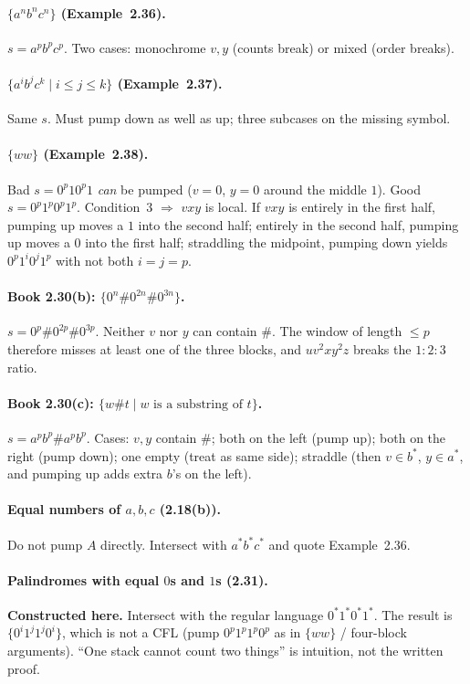\documentclass[11pt,a4paper]{article}
\begin{document}
\paragraph{$\{a^nb^nc^n\}$ (Example~2.36).}
$s=a^pb^pc^p$. Two cases: monochrome $v,y$ (counts break) or
mixed (order breaks).

\paragraph{$\{a^ib^jc^k\mid i\le j\le k\}$ (Example~2.37).}
Same $s$. Must pump down as well as up; three subcases on the
missing symbol.

\paragraph{$\{ww\}$ (Example~2.38).}
Bad $s=0^p10^p1$ \emph{can} be pumped ($v=0$, $y=0$ around the
middle $1$). Good $s=0^p1^p0^p1^p$. Condition~3 $\Rightarrow$
$vxy$ is local. If $vxy$ is entirely in the first half, pumping
up moves a $1$ into the second half; entirely in the second half,
pumping up moves a $0$ into the first half; straddling the
midpoint, pumping down yields $0^p1^i0^j1^p$ with not both
$i=j=p$.

\paragraph{Book 2.30(b): $\{0^n\#0^{2n}\#0^{3n}\}$.}
$s=0^p\#0^{2p}\#0^{3p}$. Neither $v$ nor $y$ can contain $\#$.
The window of length $\le p$ therefore misses at least one of the
three blocks, and $uv^2xy^2z$ breaks the $1:2:3$ ratio.

\paragraph{Book 2.30(c): $\{w\#t\mid w\text{ is a substring of }t\}$.}
$s=a^pb^p\#a^pb^p$. Cases: $v,y$ contain $\#$; both on the left
(pump up); both on the right (pump down); one empty (treat as
same side); straddle (then $v\in b^*$, $y\in a^*$, and pumping
up adds extra $b$'s on the left).

\paragraph{Equal numbers of $a,b,c$ (2.18(b)).}
Do not pump $A$ directly. Intersect with $a^*b^*c^*$ and quote
Example~2.36.

\paragraph{Palindromes with equal $0$s and $1$s (2.31).}
\textbf{Constructed here.} Intersect with the regular language
$0^*1^*0^*1^*$. The result is $\{0^i1^j1^j0^i\}$, which is not a
CFL (pump $0^p1^p1^p0^p$ as in $\{ww\}$ / four-block arguments).
``One stack cannot count two things'' is intuition, not the
written proof.
\end{document}
